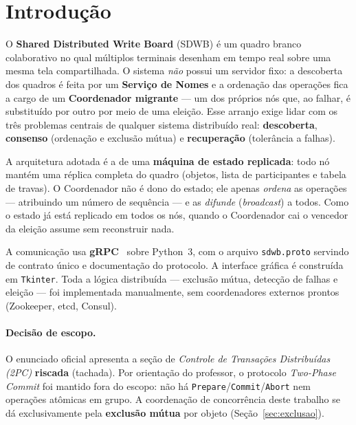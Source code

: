 \section{Introdução}
\label{sec:introducao}

O \textbf{Shared Distributed Write Board} (SDWB) é um quadro branco colaborativo no qual
múltiplos terminais desenham em tempo real sobre uma mesma tela compartilhada. O sistema
\emph{não} possui um servidor fixo: a descoberta dos quadros é feita por um
\textbf{Serviço de Nomes} e a ordenação das operações fica a cargo de um
\textbf{Coordenador migrante} --- um dos próprios nós que, ao falhar, é substituído por
outro por meio de uma eleição. Esse arranjo exige lidar com os três problemas centrais de
qualquer sistema distribuído real: \textbf{descoberta}, \textbf{consenso} (ordenação e
exclusão mútua) e \textbf{recuperação} (tolerância a falhas).

A arquitetura adotada é a de uma \textbf{máquina de estado replicada}: todo nó mantém uma
réplica completa do quadro (objetos, lista de participantes e tabela de travas). O
Coordenador não é dono do estado; ele apenas \emph{ordena} as operações --- atribuindo um
número de sequência --- e as \emph{difunde} (\emph{broadcast}) a todos. Como o estado já
está replicado em todos os nós, quando o Coordenador cai o vencedor da eleição assume sem
reconstruir nada.

A comunicação usa \textbf{gRPC}~\citep{grpc} sobre Python~3, com o arquivo
\texttt{sdwb.proto} servindo de contrato único e documentação do protocolo. A interface
gráfica é construída em \texttt{Tkinter}. Toda a lógica distribuída --- exclusão mútua,
detecção de falhas e eleição --- foi implementada manualmente, sem coordenadores externos
prontos (Zookeeper, etcd, Consul).

\paragraph{Decisão de escopo.} O enunciado oficial apresenta a seção de
\emph{Controle de Transações Distribuídas (2PC)} \textbf{riscada} (tachada). Por orientação
do professor, o protocolo \emph{Two-Phase Commit} foi mantido fora do escopo: não há
\texttt{Prepare}/\texttt{Commit}/\texttt{Abort} nem operações atômicas em grupo. A
coordenação de concorrência deste trabalho se dá exclusivamente pela \textbf{exclusão
mútua} por objeto (Seção~\ref{sec:exclusao}).
